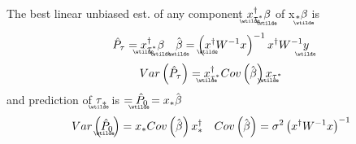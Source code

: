 \documentclass{article}
\begin{document}
The best linear unbiased est. of any component $%
\underaccent{\wtilde}{x}%
_{\tau ^{\ast }}^{\dagger }%
\underaccent{\wtilde}{\beta}%
$ of x$_{\ast }%
\underaccent{\wtilde}{\beta}%
$ is%
\begin{equation*}
\hat{P}_{\tau }=%
\underaccent{\wtilde}{x}%
_{\tau ^{\ast }}^{\dagger }%
\underaccent{\wtilde}{\beta}%
\quad 
\underaccent{\wtilde}{\hat{\beta}}%
=\left( 
\underaccent{\wtilde}{x}%
^{\dagger }W^{-1}x\right) ^{-1}x^{\dagger }W^{-1}%
\underaccent{\wtilde}{y}%
\end{equation*}%
\begin{equation*}
Var\left( \hat{P}_{\tau }\right) =%
\underaccent{\wtilde}{x}%
_{\tau ^{\ast }}^{\dagger }Cov\left( \hat{\beta}\right) 
\underaccent{\wtilde}{x}%
_{\tau ^{\ast }}
\end{equation*}%
and prediction of $%
\underaccent{\wtilde}{\tau}%
_{\ast }$ is $=%
\underaccent{\wtilde}{\hat{P}}%
_{0}=x_{\ast }\hat{\beta}$%
\begin{equation*}
Var\left( 
\underaccent{\wtilde}{\hat{P}}%
_{0}\right) =x_{\ast }Cov\left( \hat{\beta}\right) x_{\ast }^{\dagger }\quad
Cov\left( \hat{\beta}\right) =\sigma ^{2}\left( x^{\dagger }W^{-1}x\right)
^{-1}
\end{equation*}
\end{document}
